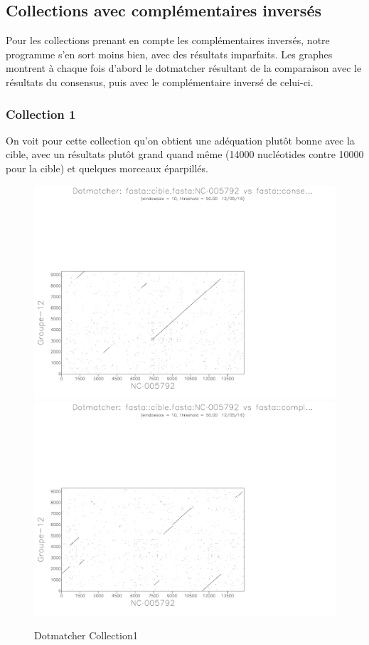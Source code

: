 \documentclass[a4paper]{article}
\begin{document}
\subsection{Collections avec complémentaires inversés}

Pour les collections prenant en compte les complémentaires inversés,
notre programme s'en sort moins bien, avec des résultats imparfaits.
Les graphes montrent à chaque fois d'abord le dotmatcher résultant
de la comparaison avec le résultats du consensus, puis avec le complémentaire
inversé de celui-ci.


\subsubsection{Collection 1}

On voit pour cette collection qu'on obtient une adéquation plutôt
bonne avec la cible, avec un résultats plutôt grand quand même (14000
nucléotides contre 10000 pour la cible) et quelques morceaux éparpillés.

\begin{figure}[H]
\includegraphics[scale=0.25]{1}\includegraphics[scale=0.25]{1compl}\caption{Dotmatcher Collection1}
\end{figure}
\end{document}
